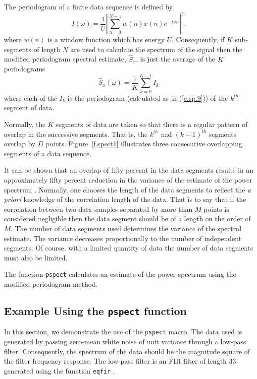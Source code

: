 	The periodogram of a finite data sequence is defined by
%
\begin{equation}
I(\omega)=\frac{1}{U}|\sum_{n=0}^{N-1}w(n)x(n)e^{-j\omega n}|^2.
\label{e.sp.9}
\end{equation}
%
where $w(n)$ is a window function which has energy $U$.  Consequently,
if $K$ sub-segments of length $N$ are used to calculate the spectrum
of the signal then the modified periodogram spectral estimate, $\hat{S}_x$,
is just the average of the $K$ periodograms
%
\begin{equation}
\hat{S}_x(\omega)=\frac{1}{K}\sum_{k=0}^{K-1}I_k
\label{e.sp.10}
\end{equation}
%
where each of the $I_k$ is the periodogram (calculated as in (\ref{e.sp.9}))
of the $k^{th}$ segment of data.

	Normally, the $K$ segments of data are taken so that there
is a regular pattern of overlap in the successive segments.  That is,
the $k^{th}$ and $(k+1)^{th}$ segments overlap by $D$ points.
Figure~\ref{f.spect1} illustrates three consecutive
overlapping segments of a data sequence.
%

%
It can be shown that an overlap of fifty percent in the data segments
results in an approximately fifty percent reduction in the variance
of the estimate of the power spectrum \cite{rabiner}.  Normally, one
chooses the length of the data segments to reflect the {\em a priori}
knowledge of the correlation length of the data.  That is to say
that if the correlation between two data samples separated by more than $M$
points is considered negligible then the data segment should be of
a length on the order of $M$.  The number of data segments used determines
the variance of the spectral estimate.  The variance decreases proportionally
to the number of independent segments.  Of course, with a limited
quantity of data the number of data segments must also be limited.

	The function {\tt pspect} calculates an estimate of
the power spectrum using the modified periodogram method.

\subsection{Example Using the {\tt pspect} function}

	In this section, we demonstrate the use of the {\tt pspect}
macro.  The data used is generated by passing zero-mean white noise
of unit variance through a low-pass filter.  Consequently, the spectrum
of the data should be the magnitude square of the filter frequency
response.  The low-pass filter is an FIR filter of length 33 generated
using the function {\tt eqfir} .  

